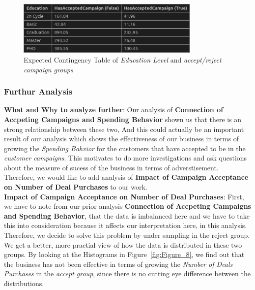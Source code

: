 \documentclass[a4paper,12pt]{article}
\begin{document}
\begin{figure}[H]
    \centering
    \includegraphics[width=0.8\textwidth]{./images/expected_contingency_table_of_edu_level_and_accept_reject_campaign.png}
    \caption{Expected Contingency Table of \textit{Education Level} and \textit{accept/reject campaign groups}}
    \label{fig:Figure_7}
\end{figure}


\subsubsection*{Furthur Analysis} 
\noindent \textbf{What and Why to analyze further}: Our analysis of \textbf{Connection of Accpeting Campaigns and Spending Behavior} shown us that there is an strong relationship between these two, 
And this could actually be an important result of our analysis which shows the effectiveness of our business in terms of growing the \textit{Spending Bahvior} for the customers that have accepted to be in the \textit{customer campaigns}. 
This motivates to do more investigations and ask questions about the measure of sucess of the business in terms of adverstisement. Therefore, we would like to add analysis of \textbf{Impact of Campaign Acceptance on Number of Deal Purchases} to our work. \\

\noindent \textbf{Impact of Campaign Acceptance on Number of Deal Purchases}: First, we have to note from our prior analysis \textbf{Connection of Accpeting Campaigns and Spending Behavior}, that the data is imbalanced here and we have to take this into consideration because it affects our interpretation here, in this analysis. 
Therefore, we decide to solve this problem by under sampling in the reject group. We get a better, more practial view of how the data is distributed in these two groups.
By looking at the Histograms in Figure~\ref{fig:Figure_8}, we find out that the business has not been effective in terms of growing the \textit{Number of Deals Purchases} in the \textit{accept group}, since there is no cutting eye difference between the distributions.
\end{document}
